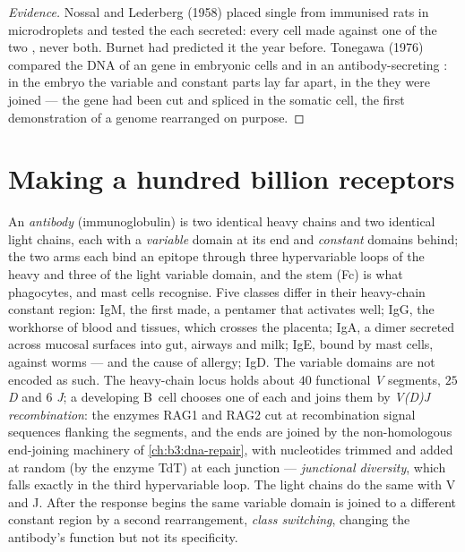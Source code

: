 \begin{proof}[Evidence]
Nossal and Lederberg (1958) placed single  from immunised
rats in microdroplets and tested the  each secreted: every
cell made  against one of the two , never both. Burnet
had predicted it the year before. Tonegawa (1976) compared the DNA of
an  gene in embryonic cells and in an antibody-secreting
: in the embryo the variable and constant parts lay far apart, in
the  they were joined --- the gene had been cut and spliced in
the somatic cell, the first demonstration of a genome rearranged on
purpose.
\end{proof}

\section{Making a hundred billion receptors}

\begin{definition}\label{def:b3:adaptive-immunity:antibody}
An \emph{antibody} (immunoglobulin) is two identical heavy chains and
two identical light chains, each with a \emph{variable} domain at its
end and \emph{constant} domains behind; the two arms each bind an
epitope through three hypervariable loops of the heavy and three of
the light variable domain, and the stem (Fc) is what phagocytes,
 and mast cells recognise. Five classes differ in their
heavy-chain constant region: IgM, the first made, a pentamer that
activates  well; IgG, the workhorse of blood and tissues,
which crosses the placenta; IgA, a dimer secreted across mucosal
surfaces into gut, airways and milk; IgE, bound by mast cells, against
worms --- and the cause of allergy; IgD. The variable domains are not
encoded as such. The heavy-chain locus holds about $40$ functional
\emph{V} segments, $25$ \emph{D} and $6$ \emph{J}; a developing B~cell
chooses one of each and joins them by \emph{V(D)J recombination}: the
enzymes RAG1 and RAG2 cut at recombination signal sequences flanking
the segments, and the ends are joined by the non-homologous end-joining
machinery of \cref{ch:b3:dna-repair}, with nucleotides trimmed and
added at random (by the enzyme TdT) at each junction --- \emph{junctional
diversity}, which falls exactly in the third hypervariable loop. The
light chains do the same with V and J. After the response begins the
same variable domain is joined to a different constant region by a
second rearrangement, \emph{class switching}, changing the antibody's
function but not its specificity.
\end{definition}


